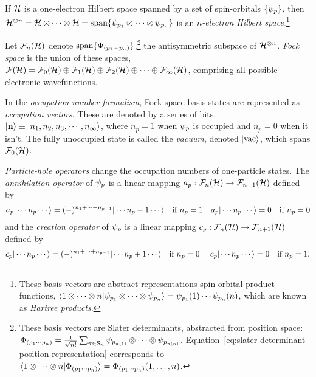 \documentclass[11pt]{article}
\numberwithin{equation}{section}
\begin{document}
\begin{dfn}
If $\mathcal{H}$ is a one-electron Hilbert space spanned by a set of spin-orbitals $\{\psi _p\}$, then $\mathcal{H}^{\otimes n}=\mathcal{H}\otimes\cdots\otimes\mathcal{H}=\mathrm{span}\{\psi _{p_1}{}\otimes\cdots\otimes\psi _{p_n}\}$ is an \textit{$n$-electron Hilbert space}.\footnote{These basis vectors are abstract representations spin-orbital product functions, $\langle1\otimes\cdots\otimes n|\psi _{p_1}\otimes\cdots\otimes\psi _{p_n}\rangle=\psi _{p_1}(1)\cdots\psi _{p_n}(n)$, which are known as \textit{Hartree products}.}
\end{dfn}


\begin{dfn}\label{dfn:fock-space}
Let $\mathcal{F}_n(\mathcal{H})$ denote $\mathrm{span}\{\Phi _{(p_1\cdots p_n)}\}$,\footnote{%
These basis vectors are Slater determinants, abstracted from position space:
$
  \F_{(p_1\cd p_n)}
=
  \fr{1}{\sqrt{n!}}
  \sum_{\pi\in\mr{S}_n}
  \y_{p_{\pi(1)}}\otimes\cd\otimes
  \y_{p_{\pi(n)}}
$.
Equation~\ref{eq:slater-determinant-position-representation} corresponds to
$
  \langle1\otimes\cdots\otimes n|\Phi _{(p_1\cdots p_n)}\rangle= \Phi _{(p_1\cdots p_n)}(1,\ldots,n)
$.
}
the antisymmetric subspace of $\mathcal{H}^{\otimes n}$.
\textit{Fock space} is the union of these spaces, $\mathcal{F}(\mathcal{H})=\mathcal{F}_0(\mathcal{H})\oplus \mathcal{F}_1(\mathcal{H})\oplus \mathcal{F}_2(\mathcal{H})\oplus\cdots\oplus \mathcal{F}_{\infty}(\mathcal{H})$, comprising all possible electronic wavefunctions.
\end{dfn}

\begin{dfn}\label{occupation-number-representation}
In the \textit{occupation number formalism}, Fock space basis states are represented as \textit{occupation vectors}.
These are denoted by a series of bits,
$
  |\mathbf{n}\rangle
\equiv
  |n_1,n_2,n_3,\cdots,n_\infty\rangle
$,
where $n_p=1$ when $\psi _p$ is occupied and $n_p=0$ when it isn't.
The fully unoccupied state is called the \textit{vacuum}, denoted $|\mathrm{vac}\rangle$, which spans $\mathcal{F}_0(\mathcal{H})$.
\end{dfn}

\begin{dfn}\label{dfn:particle-hole-operators}
\textit{Particle-hole operators} change the occupation numbers of one-particle states.
The \textit{annihilation operator} of $\psi _p$ is a linear mapping $a_p:\mathcal{F}_n(\mathcal{H})\rightarrow \mathcal{F}_{n-1}(\mathcal{H})$ defined by
\begin{align}\label{eq:occ-num-annihilation-operator-action}
  a_p|\cdots n_p\cdots\rangle
=
  (-)^{n_1+\cdots+n_{p-1}}
  |\cdots n_p-1\cdots\rangle
\ \ \ \text{if $n_p=1$}
&&
  a_p|\cdots n_p\cdots\rangle
=
  0
\ \ \ \text{if $n_p=0$}
\end{align}
and the \textit{creation operator} of $\psi _p$ is a linear mapping $c_p:\mathcal{F}_n(\mathcal{H})\rightarrow \mathcal{F}_{n+1}(\mathcal{H})$ defined by
\begin{align}\label{eq:occ-num-creation-operator-action}
  c_p|\cdots n_p\cdots\rangle
=
  (-)^{n_1+\cdots+n_{p-1}}
  |\cdots n_p+1\cdots\rangle
\ \ \ \text{if $n_p=0$\ }
&&
  c_p|\cdots n_p\cdots\rangle
=
  0
\ \ \ \text{if $n_p=1$.}
\end{align}
\end{dfn}
\end{document}
